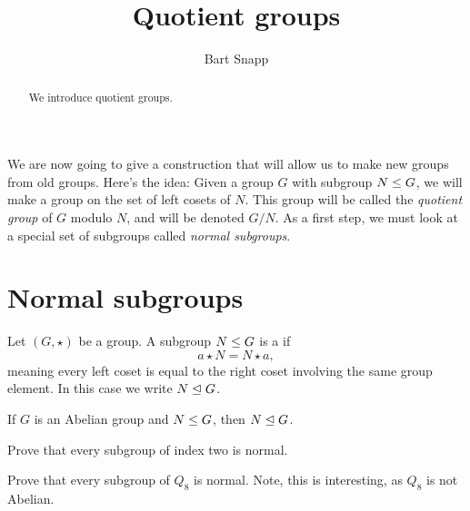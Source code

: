 \documentclass{ximera}
\author{Bart Snapp}
\title{Quotient groups}
\begin{document}
\begin{abstract}
  We introduce quotient groups.
\end{abstract}
\maketitle



We are now going to give a construction that will allow us to make new
groups from old groups. Here's the idea: Given a group $G$ with
subgroup $N\leq G$, we will make a group on the set of left cosets
of $N$. This group will be called the \textit{quotient group} of $G$
modulo $N$, and will be denoted $G/N$.  As a first step, we must look
at a special set of subgroups called \textit{normal subgroups}.




\section{Normal subgroups}




\begin{definition}
  Let $(G,\star)$ be a group. A subgroup $N\leq G$ is a 
  if
  \[
  a\star N = N\star a,
  \]
  meaning every left coset is equal to the right coset involving the
  same group element. In this case we write $N\trianglelefteq G$. 
\end{definition}

\begin{corollary}
  If $G$ is an Abelian group and $N\leq G$, then $N\trianglelefteq G$.
\end{corollary}





\begin{exercise}
  Prove that every subgroup of index two is normal.
\end{exercise}

\begin{exercise}
  Prove that every subgroup of $Q_8$ is normal. Note, this is
  interesting, as $Q_8$ is not Abelian.
\end{exercise}
\end{document}
